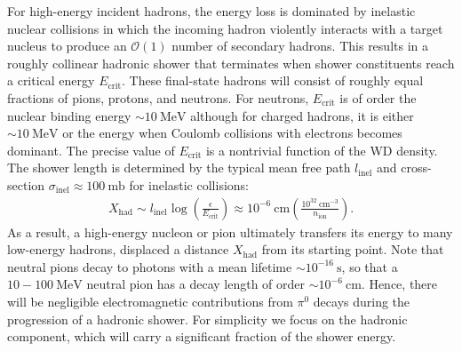\documentclass[preprintnumbers,amsmath,amssymb,prd, superscriptaddress,twocolumn]{revtex4}
\newcommand{\OO}{\mathcal{O}}
\newcommand{\MeV}{\text{MeV}}
\def\r{\right)}
\def\l{\left(}
\begin{document}
For high-energy incident hadrons, the energy loss is dominated by inelastic nuclear collisions in which the incoming hadron violently interacts with a target nucleus to produce an $\OO(1)$ number of secondary hadrons.
This results in a roughly collinear hadronic shower that terminates when shower constituents reach a critical energy $E_\text{crit}$.
These final-state hadrons will consist of roughly equal fractions of pions, protons, and neutrons.
For neutrons, $E_\text{crit}$ is of order the nuclear binding energy $\sim 10 ~\text{MeV}$ although for charged hadrons, it is either $\sim 10 ~\MeV$ or the energy when Coulomb collisions with electrons becomes dominant.
The precise value of $E_\text{crit}$ is a nontrivial function of the WD density.
The shower length is determined by the typical mean free path $l_\text{inel}$ and cross-section $\sigma_\text{inel} \approx 100 ~\text{mb}$ for inelastic collisions:
\begin{align}
\label{eq:hadlength}
  X_\text{had} \sim l_\text{inel} \log\l\frac{\epsilon}{E_\text{crit}}\r
  \approx 10^{-6} ~\text{cm} \l\frac{10^{32}~\text{cm}^{-3}}{n_\text{ion}}\r.
\end{align}
As a result, a high-energy nucleon or pion ultimately transfers its energy to many low-energy hadrons, displaced a distance $X_\text{had}$ from its starting point.
Note that neutral pions decay to photons with a mean lifetime $\sim 10^{-16} ~\text{s}$, so that a $10 - 100 ~\text{MeV}$ neutral pion has a decay length of order $\sim 10^{-6} ~\text{cm}$.
Hence, there will be negligible electromagnetic contributions from $\pi^0$ decays during the progression of a hadronic shower.
For simplicity we focus on the hadronic component, which will carry a significant fraction of the shower energy.
\end{document}
